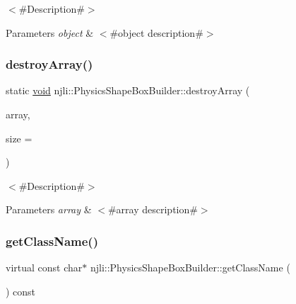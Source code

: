 $<$\#\+Description\#$>$


\begin{DoxyParams}{Parameters}
{\em object} & $<$\#object description\#$>$ \\
\hline
\end{DoxyParams}
\mbox{\label{classnjli_1_1_physics_shape_box_builder_a82c983d44cde0dc3a4bbe9213c2d41b4}} 
\subsubsection{\texorpdfstring{destroy\+Array()}{destroyArray()}}
{\footnotesize\ttfamily static \mbox{\hyperlink{_thread_8h_af1e856da2e658414cb2456cb6f7ebc66}{void}} njli\+::\+Physics\+Shape\+Box\+Builder\+::destroy\+Array (\begin{DoxyParamCaption}\item[{\mbox{\hyperlink{classnjli_1_1_physics_shape_box_builder}{Physics\+Shape\+Box\+Builder}} $\ast$$\ast$}]{array,  }\item[{const \mbox{\hyperlink{_util_8h_a10e94b422ef0c20dcdec20d31a1f5049}{u32}}}]{size = {} }\end{DoxyParamCaption})\hspace{0.3cm}{\ttfamily [static]}}

$<$\#\+Description\#$>$


\begin{DoxyParams}{Parameters}
{\em array} & $<$\#array description\#$>$ \\
\hline
\end{DoxyParams}
\mbox{\label{classnjli_1_1_physics_shape_box_builder_a81c30888998942dae14ca1ed4c766b10}} 
\subsubsection{\texorpdfstring{get\+Class\+Name()}{getClassName()}}
{\footnotesize\ttfamily virtual const char$\ast$ njli\+::\+Physics\+Shape\+Box\+Builder\+::get\+Class\+Name (\begin{DoxyParamCaption}{ }\end{DoxyParamCaption}) const\hspace{0.3cm}{\ttfamily [virtual]}}

